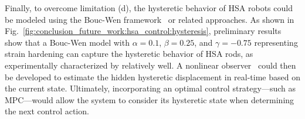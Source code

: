 Finally, to overcome limitation (d), the hysteretic behavior of \gls{HSA} robots could be modeled using the Bouc-Wen framework~\citep{bouc1967forced, wen1976method} or related approaches. As shown in Fig.~\ref{fig:conclusion_future_work:hsa_control:hysteresis}, preliminary results show that a Bouc-Wen model with $\alpha=0.1$, $\beta=0.25$, and $\gamma=-0.75$ representing strain hardening can capture the hysteretic behavior of \gls{HSA} rods, as experimentally characterized by \citet{truby2021recipe} relatively well.
A nonlinear observer~\citep{shao2023model} could then be developed to estimate the hidden hysteretic displacement in real-time based on the current state. Ultimately, incorporating an optimal control strategy—such as \gls{MPC}—would allow the system to consider its hysteretic state when determining the next control action.

